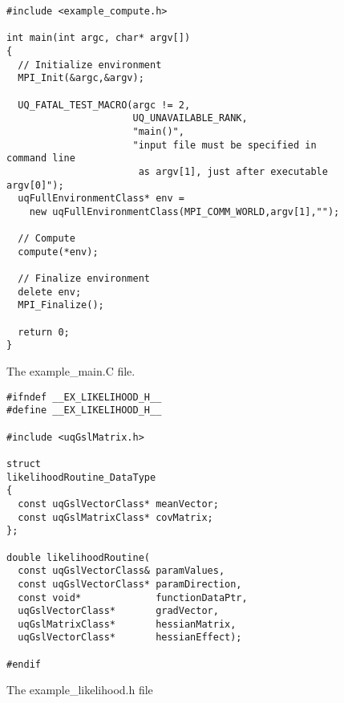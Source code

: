\begin{figure}[h!]
\begin{center}
\begin{verbatim}
#include <example_compute.h>

int main(int argc, char* argv[])
{
  // Initialize environment
  MPI_Init(&argc,&argv);

  UQ_FATAL_TEST_MACRO(argc != 2,
                      UQ_UNAVAILABLE_RANK,
                      "main()",
                      "input file must be specified in command line
                       as argv[1], just after executable argv[0]");
  uqFullEnvironmentClass* env =
    new uqFullEnvironmentClass(MPI_COMM_WORLD,argv[1],"");

  // Compute
  compute(*env);

  // Finalize environment
  delete env;
  MPI_Finalize();

  return 0;
}
\end{verbatim}
\end{center}
\caption{
The example\_main.C file.
}
\label{fig-main-c}
\end{figure}

\begin{figure}[h!]
\begin{center}
\begin{verbatim}
#ifndef __EX_LIKELIHOOD_H__
#define __EX_LIKELIHOOD_H__

#include <uqGslMatrix.h>

struct
likelihoodRoutine_DataType
{
  const uqGslVectorClass* meanVector;
  const uqGslMatrixClass* covMatrix;
};

double likelihoodRoutine(
  const uqGslVectorClass& paramValues,
  const uqGslVectorClass* paramDirection,
  const void*             functionDataPtr,
  uqGslVectorClass*       gradVector,
  uqGslMatrixClass*       hessianMatrix,
  uqGslVectorClass*       hessianEffect);

#endif
\end{verbatim}
\end{center}
\caption{
The example\_likelihood.h file
}
\label{fig-like-h}
\end{figure}

